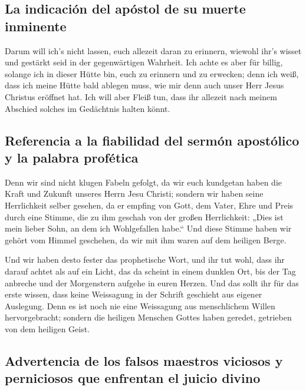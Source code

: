 \hypertarget{la-indicaciuxf3n-del-apuxf3stol-de-su-muerte-inminente}{%
\subsection{La indicación del apóstol de su muerte
inminente}\label{la-indicaciuxf3n-del-apuxf3stol-de-su-muerte-inminente}}

 Darum will ich's nicht lassen, euch allezeit daran zu
erinnern, wiewohl ihr's wisset und gestärkt seid in der gegenwärtigen
Wahrheit.  Ich achte es aber für billig, solange ich in
dieser Hütte bin, euch zu erinnern und zu erwecken;  denn
ich weiß, dass ich meine Hütte bald ablegen muss, wie mir denn auch
unser Herr Jesus Christus eröffnet hat.  Ich will aber
Fleiß tun, dass ihr allezeit nach meinem Abschied solches im Gedächtnis
halten könnt.

\hypertarget{referencia-a-la-fiabilidad-del-sermuxf3n-apostuxf3lico-y-la-palabra-profuxe9tica}{%
\subsection{Referencia a la fiabilidad del sermón apostólico y la
palabra
profética}\label{referencia-a-la-fiabilidad-del-sermuxf3n-apostuxf3lico-y-la-palabra-profuxe9tica}}

 Denn wir sind nicht klugen Fabeln gefolgt, da wir euch
kundgetan haben die Kraft und Zukunft unseres Herrn Jesu Christi;
sondern wir haben seine Herrlichkeit selber gesehen,  da
er empfing von Gott, dem Vater, Ehre und Preis durch eine Stimme, die zu
ihm geschah von der großen Herrlichkeit: „Dies ist mein lieber Sohn, an
dem ich Wohlgefallen habe.``  Und diese Stimme haben wir
gehört vom Himmel geschehen, da wir mit ihm waren auf dem heiligen
Berge.

 Und wir haben desto fester das prophetische Wort, und
ihr tut wohl, dass ihr darauf achtet als auf ein Licht, das da scheint
in einem dunklen Ort, bis der Tag anbreche und der Morgenstern aufgehe
in euren Herzen.  Und das sollt ihr für das erste wissen,
dass keine Weissagung in der Schrift geschieht aus eigener Auslegung.
 Denn es ist noch nie eine Weissagung aus menschlichem
Willen hervorgebracht; sondern die heiligen Menschen Gottes haben
geredet, getrieben von dem heiligen Geist.

\hypertarget{advertencia-de-los-falsos-maestros-viciosos-y-perniciosos-que-enfrentan-el-juicio-divino}{%
\subsection{Advertencia de los falsos maestros viciosos y perniciosos
que enfrentan el juicio
divino}\label{advertencia-de-los-falsos-maestros-viciosos-y-perniciosos-que-enfrentan-el-juicio-divino}}


